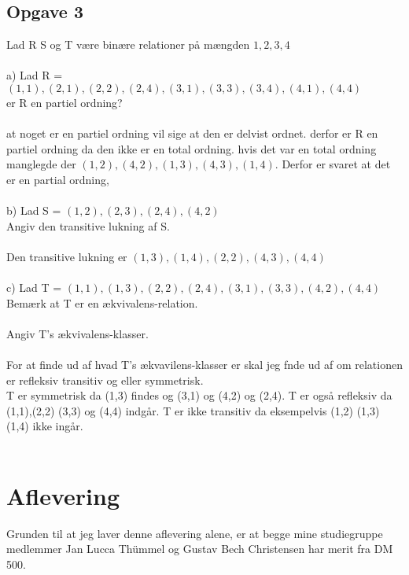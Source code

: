 \documentclass{article}
\begin{document}
\subsection{Opgave 3}
Lad R S og T være binære relationer på mængden ${1,2,3,4}$\\\\
a) Lad R = ${(1,1),(2,1),(2,2),(2,4),(3,1),(3,3),(3,4),(4,1),(4,4)}$\\
er R en partiel ordning?\\\\
at noget er en partiel ordning vil sige at den er delvist ordnet. derfor er R en partiel ordning da den ikke er en total ordning. hvis det var en total ordning manglegde der ${(1,2),(4,2),(1,3),(4,3),(1,4)}$. Derfor er svaret at det er en partial ordning, \\\\
b) Lad S = ${(1,2),(2,3),(2,4),(4,2)}$ \\
Angiv den transitive lukning af S. \\\\
Den transitive lukning er ${(1,3),(1,4),(2,2),(4,3),(4,4)}$ \\\\
c) Lad T = ${(1,1),(1,3),(2,2),(2,4),(3,1),(3,3),(4,2),(4,4)}$\\
Bemærk at T er en ækvivalens-relation. \\\\
Angiv T's ækvivalens-klasser.\\\\
For at finde ud af hvad T's ækvavilens-klasser er skal jeg fnde ud af om relationen er refleksiv transitiv og eller symmetrisk.\\
T er symmetrisk da (1,3) findes og (3,1) og (4,2) og (2,4). T er også refleksiv da (1,1),(2,2) (3,3) og (4,4) indgår. T er ikke transitiv da eksempelvis (1,2) (1,3) (1,4) ikke ingår. \\\\
\section{Aflevering}
Grunden til at jeg laver denne aflevering alene, er at begge mine studiegruppe medlemmer Jan Lucca Thümmel og Gustav Bech Christensen har merit fra DM 500.




    
\end{document}
